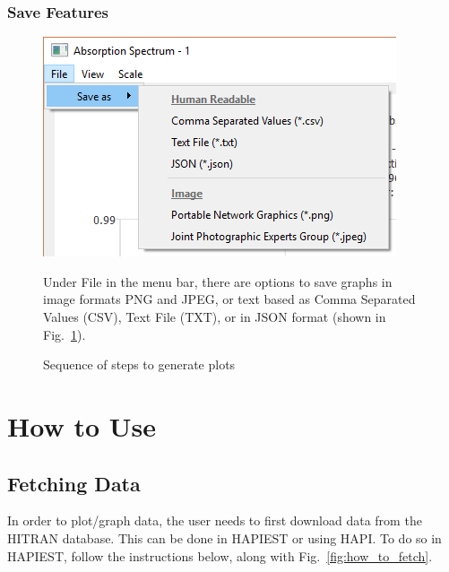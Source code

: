 \documentclass[12pt]{article}
\begin{document}
\subsubsection*{Save Features}
\begin{figure}[h]
\begin{minipage}[c]{0.3\textwidth}
\centering
\includegraphics[scale = 0.5]{GraphSave}
\caption{Sequence of steps to generate plots}
\label{fig:save}
\end{minipage}
\hfill\vline\hfill
\begin{minipage}[c]{0.6\textwidth}
Under File in the menu bar, there are options to save graphs in image formats PNG and JPEG, or  text based as Comma Separated Values (CSV), Text File (TXT), or in JSON format (shown in Fig.~\ref{fig:save}).
\end{minipage}
\end{figure}
\newpage
\section{How to Use}

\subsection{Fetching Data}
In order to plot/graph data, the user needs to first download data from the HITRAN database. This can be done in HAPIEST or using HAPI. To do so in HAPIEST, follow the instructions below, along with Fig.~\ref{fig:how_to_fetch}.
\end{document}

